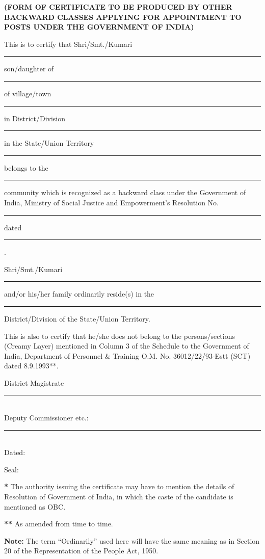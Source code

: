 \documentclass[12pt]{article}
\begin{document}
	
	\begin{center}
		\textbf{\large (FORM OF CERTIFICATE TO BE PRODUCED BY OTHER BACKWARD CLASSES APPLYING FOR APPOINTMENT TO POSTS UNDER THE GOVERNMENT OF INDIA)}
	\end{center}
	
	\vspace{1cm}
	
	\noindent
	This is to certify that Shri/Smt./Kumari \rule{6cm}{0.4pt} son/daughter of \rule{6cm}{0.4pt} of village/town \rule{5cm}{0.4pt} in District/Division \rule{5cm}{0.4pt} in the State/Union Territory \rule{3cm}{0.4pt} belongs to the \rule{5cm}{0.4pt} community which is recognized as a backward class under the Government of India, Ministry of Social Justice and Empowerment’s Resolution No. \rule{5cm}{0.4pt} dated \rule{3cm}{0.4pt}.
	
	\vspace{0.5cm}
	
	\noindent
	Shri/Smt./Kumari \rule{6cm}{0.4pt} and/or his/her family ordinarily reside(s) in the \rule{5cm}{0.4pt} District/Division of the State/Union Territory.
	
	\vspace{0.5cm}
	
	\noindent
	This is also to certify that he/she does not belong to the persons/sections (Creamy Layer) mentioned in Column 3 of the Schedule to the Government of India, Department of Personnel \& Training O.M. No. 36012/22/93-Estt (SCT) dated 8.9.1993**.
	
	\vspace{1cm}
	
	\noindent
	District Magistrate \rule{6cm}{0.4pt} \\
	
	\noindent
	Deputy Commissioner etc.: \rule{4.5cm}{0.4pt} \\
		
	\noindent
	Dated:
	
	\vspace{0.5cm}
	
	\noindent
	Seal: 
	
	\vspace{1cm}
	
	\noindent
	\textbf{*} The authority issuing the certificate may have to mention the details of Resolution of Government of India, in which the caste of the candidate is mentioned as OBC.
	
	\vspace{0.3cm}
	
	\noindent
	\textbf{**} As amended from time to time.
	
	\vspace{0.3cm}
	
	\noindent
	\textbf{Note:} The term ``Ordinarily'' used here will have the same meaning as in Section 20 of the Representation of the People Act, 1950.
	
\end{document}
